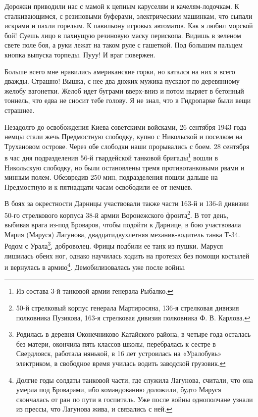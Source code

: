 Дорожки приводили нас с мамой к цепным каруселям и качелям-лодочкам. К сталкивающимся, с резиновыми буферами, электрическим машинкам, что сыпали искрами и пахли горелым. К павильону игровых автоматов. Как я любил морской бой! Суешь лицо в пахнущую резиновую маску перископа. Видишь в зеленом свете поле боя, а руки лежат на таком руле с гашеткой. Под большим пальцем кнопка выпуска торпеды. Пууу! И враг повержен.

Больше всего мне нравились американские горки, но катался на них я всего дважды. Страшно! Вышка, с нее два дюжих мужика пускают по деревянному желобу вагонетки. Желоб идет буграми вверх-вниз и потом ныряет в бетонный тоннель, что едва не сносит тебе голову. Я не знал, что в Гидропарке были вещи страшнее.

Незадолго до освобождения Киева советскими войсками, 26 сентября 1943 года немцы стали жечь Предмостную слободку, купно с Никольской и поселком на Трухановом острове. Через обе слободки наши прорывались с боем. 28 сентября в час дня подразделения 56-й гвардейской танковой бригады\footnote{Из состава 3-й танковой армии генерала Рыбалко.} вошли в Никольскую слободку, но были остановлены тремя противотанковыми рвами и минным полем. Обезвредив 250 мин, подразделения пошли дальше на Предмостную и к пятнадцати часам освободили ее от немцев.

В боях за окрестности Дарницы участвовали также части 163-й и 136-й дивизии 50-го стрелкового корпуса 38-й армии Воронежского фронта\footnote{50-й стрелковый корпус генерала Мартиросяна, 136-я стрелковая дивизия полковника Пузикова, 163-я стрелковая   дивизия полковника Ф. В. Карлова.}. В тот день, выбивая врага из-под Броваров, чтобы подойти к Дарнице, в бою участвовала Мария (Маруся) Лагунова, двадцатидвухлетняя механик-водитель танка Т-34. Родом с Урала\footnote{Родилась в деревня Оконечниково Катайского района, в четыре года осталась без матери, окончила пять классов школы, перебралась к сестре в Свердловск, работала нянькой, в 16 лет устроилась на «Уралобувь» электриком, в свободное время училась водить заводской грузовик.}, доброволец. Фрицы подбили ее танк из пушки. Маруся лишилась обеих ног, однако научилась ходить на протезах без помощи костылей и вернулась в армию\footnote{Долгие годы солдаты танковой части, где служила Лагунова, считали, что она умерла под Броварами, ибо командованию доложили, будто Маруся скончалась от ран по пути в госпиталь. Уже после войны однополчане узнали из прессы, что Лагунова жива, и связались с ней.}. Демобилизовалась уже после войны.

